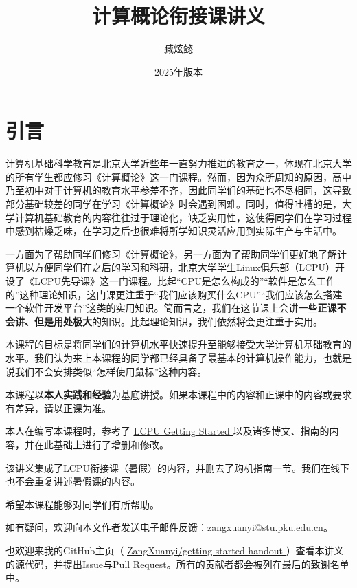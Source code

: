 \documentclass[12pt, openany]{book}
\title{\Huge\textbf{计算概论衔接课讲义}}
\author[a]{臧炫懿}
\affil[a]{北京大学信息科学技术学院}
\date{2025年版本}
\let\oldhref\href
\renewcommand{\href}[2]{%
  \oldhref{#1}{%
    \color{blue}\underline{#2}%
    \raisebox{0.2ex}{\tiny$\nearrow$}%
  }%
}
\begin{document}
\maketitle

\frontmatter

\chapter{引言}

计算机基础科学教育是北京大学近些年一直努力推进的教育之一，体现在北京大学的所有学生都应修习《计算概论》这一门课程。然而，因为众所周知的原因，高中乃至初中对于计算机的教育水平参差不齐，因此同学们的基础也不尽相同，这导致部分基础较差的同学在学习《计算概论》时会遇到困难。同时，值得吐槽的是，大学计算机基础教育的内容往往过于理论化，缺乏实用性，这使得同学们在学习过程中感到枯燥乏味，在学习之后也很难将所学知识灵活应用到实际生产与生活中。

一方面为了帮助同学们修习《计算概论》，另一方面为了帮助同学们更好地了解计算机以方便同学们在之后的学习和科研，北京大学学生Linux俱乐部（LCPU）开设了《LCPU先导课》这一门课程。比起“CPU是怎么构成的”“软件是怎么工作的”这种理论知识，这门课更注重于“我们应该购买什么CPU”“我们应该怎么搭建一个软件开发平台”这类的实用知识。简而言之，我们在这节课上会讲一些\textbf{正课不会讲、但是用处极大}的知识。比起理论知识，我们依然将会更注重于实用。

本课程的目标是将同学们的计算机水平快速提升至能够接受大学计算机基础教育的水平。我们认为来上本课程的同学都已经具备了最基本的计算机操作能力，也就是说我们不会安排类似“怎样使用鼠标”这种内容。

本课程以\textbf{本人实践和经验}为基底讲授。如果本课程中的内容和正课中的内容或要求有差异，请以正课为准。

本人在编写本课程时，参考了\href{https://missing.lcpu.dev}{LCPU Getting Started}以及诸多博文、指南的内容，并在此基础上进行了增删和修改。

该讲义集成了LCPU衔接课（暑假）的内容，并删去了购机指南一节。我们在线下也不会重复讲述暑假课的内容。

希望本课程能够对同学们有所帮助。

如有疑问，欢迎向本文作者发送电子邮件反馈：zangxuanyi@stu.pku.edu.cn。

也欢迎来我的GitHub主页（\faGithub\href{https://github.com/ZangXuanyi/getting-started-handout}{ZangXuanyi/getting-started-handout}）查看本讲义的源代码，并提出Issue与Pull Request。所有的贡献者都会被列在最后的致谢名单中。

\mainmatter
\end{document}
